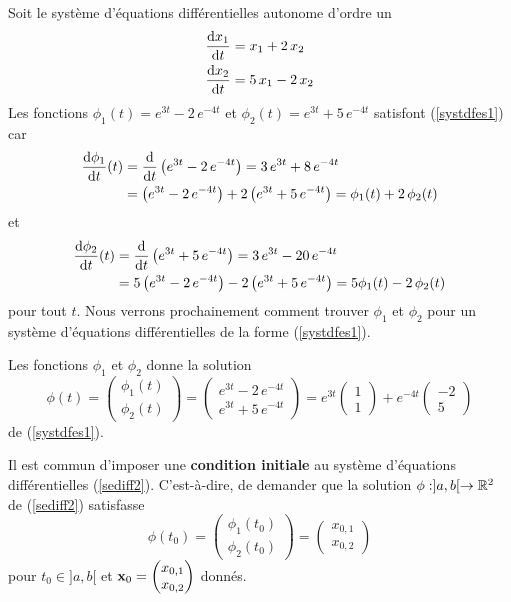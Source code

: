 {\begin{egg}
Soit le système d'équations différentielles autonome d'ordre un
\begin{equation}\label{systdfes1}
\begin{split}
\dydx{x_1}{t} &= x_1 + 2\,x_2\\
\dydx{x_2}{t} &= 5\,x_1 - 2\,x_2
\end{split}
\end{equation}
Les fonctions $\phi_1(t) = e^{3t}-2\,e^{-4t}$ et
$\phi_2(t) = e^{3t}+5\,e^{-4t}$ satisfont (\ref{systdfes1}) car
\begin{align*}
\dydx{\phi_1}{t}(t) &= \dfdx{\left(e^{3t}-2\,e^{-4t}\right)}{t}
= 3\,e^{3t}+8\,e^{-4t} \\
&= \left(e^{3t}-2\,e^{-4t}\right) +2\left(e^{3t}+5\,e^{-4t}\right)
= \phi_1(t) + 2\,\phi_2(t)
\end{align*}
et
\begin{align*}
\dydx{\phi_2}{t}(t) &= \dfdx{\left(e^{3t}+5\,e^{-4t}\right)}{t}
= 3\,e^{3t}-20\,e^{-4t} \\
&= 5\left(e^{3t}-2\,e^{-4t}\right) -2\left(e^{3t}+5\,e^{-4t}\right)
= 5\phi_1(t) - 2\,\phi_2(t)
\end{align*}
pour tout $t$.  Nous verrons prochainement comment trouver $\phi_1$ et
$\phi_2$ pour un système d'équations différentielles de la forme
(\ref{systdfes1}).

Les fonctions $\phi_1$ et $\phi_2$ donne la solution
\[
\phi(t) =
\begin{pmatrix}
\phi_1(t) \\
\phi_2(t)
\end{pmatrix}
=
\begin{pmatrix}
e^{3t}-2\,e^{-4t} \\ e^{3t}+5\,e^{-4t}
\end{pmatrix}
= e^{3t} \begin{pmatrix} 1 \\ 1 \end{pmatrix}
+ e^{-4t} \begin{pmatrix} -2 \\ 5 \end{pmatrix}
\]
de (\ref{systdfes1}).
\label{syst_egg0}
\end{egg}

Il est commun d'imposer une {\bfseries condition initiale} au système d'équations
différentielles (\ref{sediff2}).  C'est-à-dire, de demander que la solution
$\phi:]a,b[\rightarrow \RR^2$ de (\ref{sediff2}) satisfasse
\[
  \phi(t_0) = \begin{pmatrix} \phi_1(t_0) \\ \phi_2(t_0) \end{pmatrix}
  = \begin{pmatrix} x_{0,1} \\ x_{0,2} \end{pmatrix}
\]
pour $t_0\in]a,b[$ et
$\DS \VEC{x}_0 = \begin{pmatrix} x_{0,1} \\ x_{0,2} \end{pmatrix}$
donnés.

}
